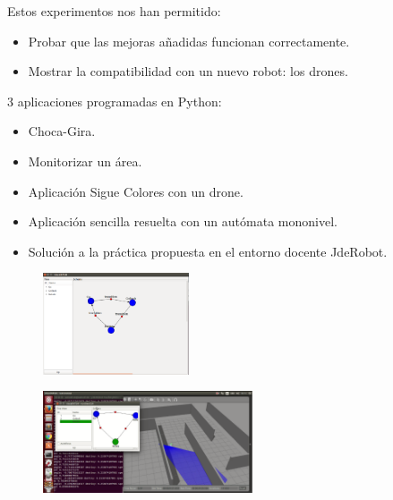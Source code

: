 \documentclass[notes,slidesec,a4]{seminar}
\begin{document}

\begin{hslide}

Estos experimentos nos han permitido:

\begin{itemize}
\item Probar que las mejoras añadidas funcionan correctamente.
\item Mostrar la compatibilidad con un nuevo robot: los drones.
\end{itemize}

3 aplicaciones programadas en Python:

\begin{itemize}
\item Choca-Gira.
\item Monitorizar un área.
\item Aplicación Sigue Colores con un drone.
\end{itemize}

\end{hslide}


\begin{hslide}

\begin{itemize}
\item Aplicación sencilla resuelta con un autómata mononivel.
\item Solución a la práctica propuesta en el entorno docente JdeRobot.
\end{itemize}

\begin{center}
\begin{minipage}[t]{0.45\textwidth}
	\begin{figure}
		\includegraphics[height=3cm]{imgs/bumpAndGoDiagram.png}
	\end{figure}
\end{minipage}
\begin{minipage}[t]{0.45\textwidth}
	\begin{figure}
		\includegraphics[height=3cm]{imgs/BAGRotate.png}
	\end{figure}
\end{minipage}
\end{center}

\end{hslide}
\end{document}
